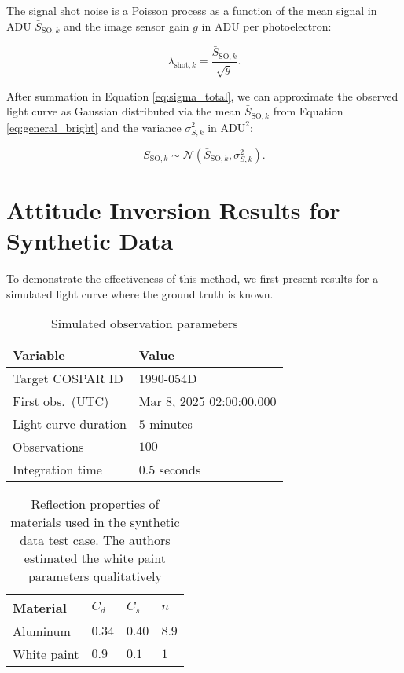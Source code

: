 \documentclass[a4paper,twocolumn]{spaceDebrisC} %
\begin{document}
The signal shot noise is a Poisson process as a function of the mean signal in ADU $\bar{S}_{\text{SO},k}$ and the image sensor gain $g$ in ADU per photoelectron:

\begin{equation}
  \lambda_{\text{shot},k} = \frac{\bar{S}_{\text{SO},k}}{\sqrt{g}}.
\end{equation}

After summation in Equation \ref{eq:sigma_total}, we can approximate the observed light curve as Gaussian distributed via the mean $\bar{S}_{\text{SO},k}$ from Equation \ref{eq:general_bright} and the variance $\sigma^2_{S,k}$ in $\text{ADU}^2$:

\begin{equation}
 S_{\text{SO},k} \sim \mathcal{N}\left( \bar{S}_{\text{SO},k}, \sigma^2_{S,k} \right).
 \end{equation}

\FloatBarrier
\section{Attitude Inversion Results for Synthetic Data}

To demonstrate the effectiveness of this method, we first present results for a simulated light curve where the ground truth is known. 

\begin{table}[ht]
  \centering
  \caption{Simulated observation parameters}
  \vspace*{6pt}
  \begin{tabular}{|l|l|}
  \hline
  \textbf{Variable} & \textbf{Value} \\ \hline
  Target COSPAR ID & 1990-054D \\ \hline
  First obs.\ (UTC) & Mar 8, 2025 02:00:00.000 \\ \hline
  Light curve duration & $5$ minutes \\ \hline
  Observations & $100$ \\ \hline
  Integration time & $0.5$ seconds \\ \hline
  \end{tabular}
  \label{tb:case1_in}
\end{table}

\begin{table}[ht]
  \centering
  \caption{Reflection properties of materials used in the synthetic data test case. The authors estimated the white paint parameters qualitatively}
  \vspace*{6pt}
  \begin{tabular}{|l|l|l|l|}
  \hline
  \textbf{Material} & $C_d$ & $C_s$ & $n$ \\ \hline
  Aluminum \cite{fankhauser2023} & $0.34$ & $0.40$ & $8.9$ \\ \hline
  White paint & $0.9$ & $0.1$ & $1$ \\ \hline
  \end{tabular}
  \label{tb:real_matprops}
 \end{table}
\end{document}
